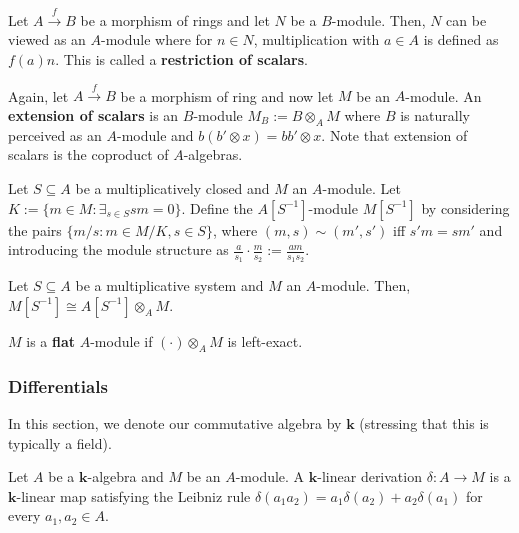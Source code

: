\documentclass{template}
\begin{document}
\begin{definition}
    Let $A \xrightarrow{f} B$ be a morphism of rings and let $N$ be a $B$-module. Then,
    $N$ can be viewed as an $A$-module where for $n \in N$, multiplication with
    $a \in A$ is defined as $f(a)n$. This is called a \textbf{restriction of
    scalars}.
\end{definition}

\begin{definition}
    Again, let $A \xrightarrow{f} B$ be a morphism of ring and now let $M$ be an
    $A$-module. An \textbf{extension of scalars} is an $B$-module $M_B := B
    \otimes_A M$ where $B$ is naturally perceived as an $A$-module and $b(b'
    \otimes x) = bb' \otimes x$. Note that extension of scalars is the coproduct
    of $A$-algebras.
\end{definition}

\begin{definition}
    Let $S \subseteq A$ be a multiplicatively closed and $M$ an $A$-module. Let
    $K := \{m \in M: \exists_{s \in S} sm=0\}$. Define the $A[S^{-1}]$-module
    $M[S^{-1}]$ by considering the pairs $\{m/s: m \in M/K, s \in S\}$, where
    $(m,s) \sim (m',s')$ iff $s'm = sm'$ and introducing the module structure as
    $\frac{a}{s_1} \cdot \frac{m}{s_2} := \frac{am}{s_1s_2}$.
\end{definition}

\begin{proposition}
    Let $S \subseteq A$ be a multiplicative system and $M$ an $A$-module. Then,
    $M[S^{-1}] \cong A[S^{-1}] \otimes_A M$.
\end{proposition}

\begin{definition}
    $M$ is a \textbf{flat} $A$-module if $(\cdot) \otimes_A M$ is left-exact.
\end{definition}

\subsubsection{Differentials}

In this section, we denote our commutative algebra by $\mathbf{k}$ (stressing
that this is typically a field).

\begin{definition}
    Let $A$ be a $\mathbf{k}$-algebra and $M$ be an $A$-module. A
    $\mathbf{k}$-linear derivation $\delta: A \to M$ is a $\mathbf{k}$-linear
    map satisfying the Leibniz rule $\delta(a_1a_2) = a_1\delta(a_2) +
    a_2\delta(a_1)$ for every $a_1,a_2 \in A$.
\end{definition}
\end{document}
